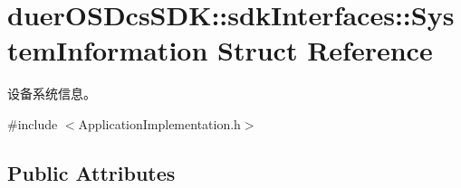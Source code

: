 \hypertarget{structduerOSDcsSDK_1_1sdkInterfaces_1_1SystemInformation}{}\section{duer\+O\+S\+Dcs\+S\+DK\+:\+:sdk\+Interfaces\+:\+:System\+Information Struct Reference}
\label{structduerOSDcsSDK_1_1sdkInterfaces_1_1SystemInformation}


设备系统信息。  




{\ttfamily \#include $<$Application\+Implementation.\+h$>$}

\subsection*{Public Attributes}
